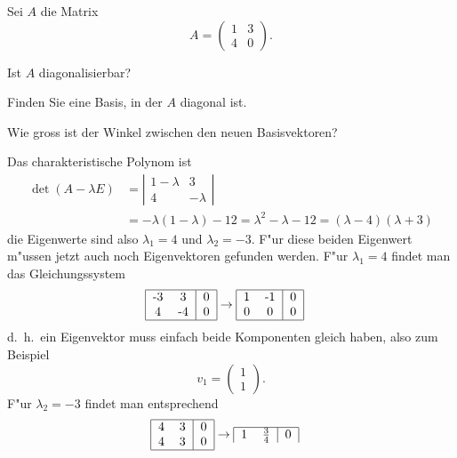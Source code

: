 Sei $A$ die Matrix
\[
A=\begin{pmatrix}
1&3\\
4&0
\end{pmatrix}.
\]
\begin{teilaufgaben}
\item Ist $A$ diagonalisierbar?
\item Finden Sie eine Basis, in der $A$ diagonal ist.
\item Wie gross ist der Winkel zwischen den neuen Basisvektoren?
\end{teilaufgaben}

\begin{loesung}
Das charakteristische Polynom ist
\begin{align*}
\det(A-\lambda E)
&=\left|\begin{matrix}
1-\lambda&3\\
4&-\lambda
\end{matrix}\right|
\\
&=-\lambda(1-\lambda)-12=\lambda^2-\lambda-12=(\lambda -4)(\lambda + 3)
\end{align*}
die Eigenwerte sind also $\lambda_1 = 4$ und $\lambda_2=-3$.
F"ur diese beiden Eigenwert m"ussen jetzt auch noch Eigenvektoren
gefunden werden. F"ur $\lambda_1=4$ findet man das Gleichungssystem
\begin{align*}
\begin{tabular}{|cc|c|}
\hline
-3&3&0\\
4&-4&0\\
\hline
\end{tabular}
&\rightarrow
\begin{tabular}{|cc|c|}
\hline
1&-1&0\\
0&0&0\\
\hline
\end{tabular}
\end{align*}
d.~h.~ein Eigenvektor muss einfach beide Komponenten gleich haben, also
zum Beispiel
\[
v_1=\begin{pmatrix}1\\1\end{pmatrix}.
\]
F"ur $\lambda_2=-3$ findet man entsprechend
\begin{align*}
\begin{tabular}{|cc|c|}
\hline
4&3&0\\
4&3&0\\
\hline
\end{tabular}
&\rightarrow
\begin{tabular}{|cc|c|}
\hline
1&$\frac34$&0\\

\end{tabular}
\end{align*}
\end{loesung}
